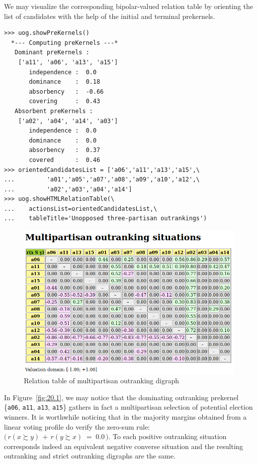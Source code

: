 We may visualize the corresponding bipolar-valued relation table by orienting the list of candidates with the help of the initial and terminal prekernels.
\begin{lstlisting}[caption={Computing unopposed multiobjective outranking situations},label=list:20.4]
>>> uog.showPreKernels()
  *--- Computing preKernels ---*
   Dominant preKernels :
    ['a11', 'a06', 'a13', 'a15']
       independence :  0.0
       dominance    :  0.18
       absorbency   :  -0.66
       covering     :  0.43
   Absorbent preKernels :
    ['a02', 'a04', 'a14', 'a03']
       independence :  0.0
       dominance    :  0.0
       absorbency   :  0.37
       covered      :  0.46
>>> orientedCandidatesList = ['a06','a11','a13','a15',\
...         'a01','a05','a07','a08','a09','a10','a12',\
...         'a02','a03','a04','a14']
>>> uog.showHTMLRelationTable(\
...    actionsList=orientedCandidatesList,\
...    tableTitle='Unopposed three-partisan outrankings')
\end{lstlisting}
\begin{figure}[ht]
\includegraphics[width=\hsize]{Figures/20-1-unOpposedOutrankings.png}
\caption{Relation table of multipartisan outranking digraph} 
\label{fig:20.1}       %
\end{figure}

In Figure~\vref{fig:20.1}, we may notice that the dominating outranking prekernel \{\texttt{a06}, \texttt{a11}, \texttt{a13}, \texttt{a15}\} gathers in fact a multipartisan selection of potential election winners. It is worthwhile noticing that in the majority margins obtained from a linear voting profile do verify the zero-sum rule: $\big(\,r(x \succsim y) \,+\, r(y \succsim x) \;=\; 0.0\,\big)$. To each positive outranking situation corresponds indeed an equivalent negative converse situation and the resulting outranking and strict outranking digraphs are the same.

